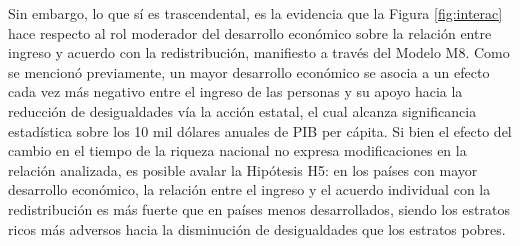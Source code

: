 \documentclass[12pt,letterpaper]{article}
\begin{document}
Sin embargo, lo que sí es trascendental, es la evidencia que la Figura \ref{fig:interac} hace respecto al rol moderador del desarrollo económico sobre la relación entre ingreso y acuerdo con la redistribución, manifiesto a través del Modelo M8. Como se mencionó previamente, un mayor desarrollo económico se asocia a un efecto cada vez más negativo entre el ingreso de las personas y su apoyo hacia la reducción de desigualdades vía la acción estatal, el cual alcanza significancia estadística sobre los 10 mil dólares anuales de PIB per cápita. Si bien el efecto del cambio en el tiempo de la riqueza nacional no expresa modificaciones en la relación analizada, es posible avalar la Hipótesis H5: en los países con mayor desarrollo económico, la relación entre el ingreso y el acuerdo individual con la redistribución es más fuerte que en países menos desarrollados, siendo los estratos ricos más adversos hacia la disminución de desigualdades que los estratos pobres.
\end{document}
